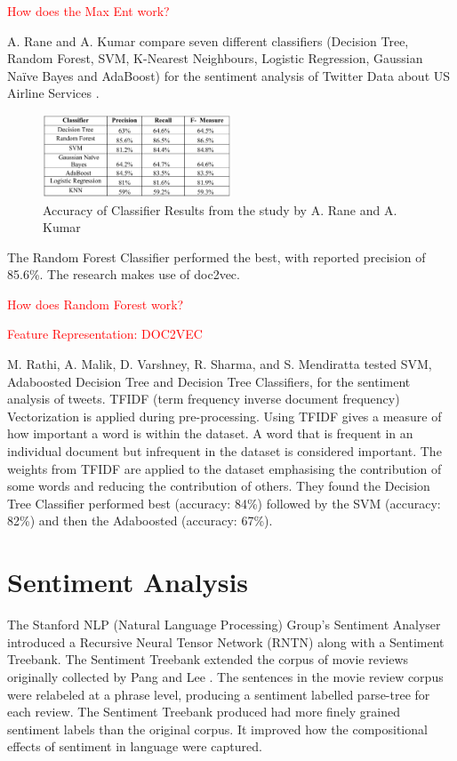 \textcolor{red}{How does the Max Ent work?}

A. Rane and A. Kumar compare seven different classifiers (Decision Tree, Random Forest, SVM, K-Nearest Neighbours, Logistic Regression, Gaussian Naïve Bayes and AdaBoost) for the sentiment analysis of Twitter Data about US Airline Services \cite{Rane2018}. 
\begin{figure}
    \centering
    \includegraphics[width=0.5\textwidth]{literature_review/arane_classifier_results.PNG}
    \caption{Accuracy of Classifier Results from the study by A. Rane and A. Kumar \cite{Rane2018}}
\end{figure}
The Random Forest Classifier performed the best, with reported precision of 85.6\%. The research makes use of doc2vec.

\textcolor{red}{How does Random Forest work?}

\textcolor{red}{Feature Representation: DOC2VEC}

M. Rathi, A. Malik, D. Varshney, R. Sharma, and S. Mendiratta \cite{Raithi2018} tested SVM, Adaboosted Decision Tree and Decision Tree Classifiers, for the sentiment analysis of tweets. TFIDF (term frequency inverse document frequency) Vectorization is applied during pre-processing. Using TFIDF gives a measure of how important a word is within the dataset. A word that is frequent in an individual document but infrequent in the dataset is considered important. The weights from TFIDF are applied to the dataset emphasising the contribution of some words and reducing the contribution of others. They found the Decision Tree Classifier performed best  (accuracy: 84\%) followed by the SVM (accuracy: 82\%) and then the Adaboosted (accuracy: 67\%). 



\section{Sentiment Analysis}

The Stanford NLP (Natural Language Processing) Group's Sentiment Analyser \cite{stanfordSentiment2013} introduced a Recursive Neural Tensor Network (RNTN) along with a Sentiment Treebank. The Sentiment Treebank extended the corpus of movie reviews originally collected by Pang and Lee \cite{panglee2004}. The sentences in the movie review corpus were relabeled at a phrase level, producing a sentiment labelled parse-tree for each review. The Sentiment Treebank produced had more finely grained sentiment labels than the original corpus. It improved how the compositional effects of sentiment in language were captured.

